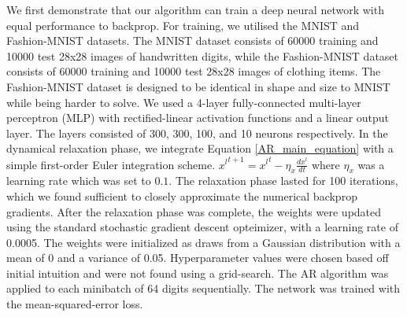 We first demonstrate that our algorithm can train a deep neural network with equal performance to backprop. For training, we utilised the MNIST and Fashion-MNIST \citep{xiao2017online} datasets. The MNIST dataset consists of 60000 training and 10000 test 28x28 images of handwritten digits, while the Fashion-MNIST dataset consists of 60000 training and 10000 test 28x28 images of clothing items. The Fashion-MNIST dataset is designed to be identical in shape and size to MNIST while being harder to solve. We used a 4-layer fully-connected multi-layer perceptron (MLP) with rectified-linear activation functions and a linear output layer. The layers consisted of 300, 300, 100, and 10 neurons respectively. In the dynamical relaxation phase, we integrate  Equation \ref{AR_main_equation} with a simple first-order Euler integration scheme. ${x^l}^{t+1} = {x^l}^t - \eta_x \frac{dx^l}{dt}$ where $\eta_x$ was a learning rate which was set to $0.1$. The relaxation phase lasted for 100 iterations, which we found sufficient to  closely approximate the numerical backprop gradients. After the relaxation phase was complete, the weights were updated using the standard stochastic gradient descent opteimizer, with a learning rate of 0.0005. The weights were initialized as draws from a Gaussian distribution with a mean of 0 and a variance of 0.05.  Hyperparameter values were chosen based off initial intuition and were not found using a grid-search. 
The AR algorithm was applied to each minibatch of 64 digits sequentially. The network was trained with the mean-squared-error loss.
